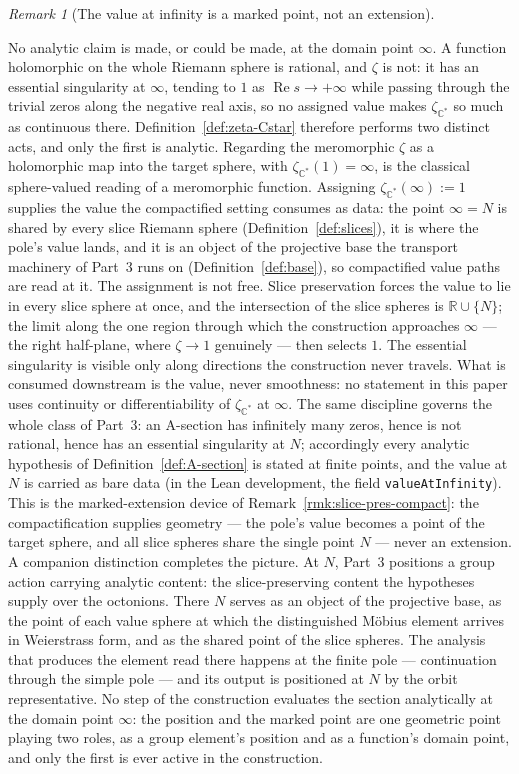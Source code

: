 \documentclass[11pt]{article}
\newcommand{\CC}{\mathbb{C}}
\newcommand{\RR}{\mathbb{R}}
\newcommand{\Cstar}{\CC^{*}}
\newcommand{\zetaC}{\zeta_{\Cstar}}
\DeclareMathOperator{\re}{Re}
\providecommand{\uses}[1]{}
\theoremstyle{plain}
\theoremstyle{definition}
\theoremstyle{remark}
\newtheorem{remark}[theorem]{Remark}
\begin{document}
\begin{remark}[The value at infinity is a marked point, not an extension]\label{rmk:infty-marked}
\uses{def:zeta-Cstar}
No analytic claim is made, or could be made, at the domain point $\infty$. A function
holomorphic on the whole Riemann sphere is rational, and $\zeta$ is not: it has an
essential singularity at $\infty$, tending to $1$ as $\re s\to+\infty$ while passing
through the trivial zeros along the negative real axis, so no assigned value makes
$\zetaC$ so much as continuous there. Definition~\ref{def:zeta-Cstar} therefore
performs two distinct acts, and only the first is analytic. Regarding the meromorphic
$\zeta$ as a holomorphic map into the target sphere, with $\zetaC(1)=\infty$, is the
classical sphere-valued reading of a meromorphic function. Assigning
$\zetaC(\infty):=1$ supplies the value the compactified setting consumes as data: the
point $\infty=N$ is shared by every slice Riemann sphere
(Definition~\ref{def:slices}), it is where the pole's value lands, and it is an
object of the projective base the transport machinery of Part~3 runs on
(Definition~\ref{def:base}), so compactified value paths are read at it. The
assignment is not free. Slice preservation forces the value to lie in every slice
sphere at once, and the intersection of the slice spheres is $\RR\cup\{N\}$; the
limit along the one region through which the construction approaches $\infty$ ---
the right half-plane, where $\zeta\to1$ genuinely --- then selects $1$. The
essential singularity is visible only along directions the construction never
travels. What is consumed downstream is the value, never smoothness: no statement
in this paper uses continuity or differentiability of $\zetaC$ at $\infty$. The
same discipline governs the whole class of Part~3: an A-section has infinitely many
zeros, hence is not rational, hence has an essential singularity at $N$; accordingly
every analytic hypothesis of Definition~\ref{def:A-section} is stated at finite
points, and the value at $N$ is carried as bare data (in the Lean development, the
field \texttt{valueAtInfinity}). This is the marked-extension device of
Remark~\ref{rmk:slice-pres-compact}: the compactification supplies geometry --- the
pole's value becomes a point of the target sphere, and all slice spheres share the
single point $N$ --- never an extension.
A companion distinction completes the picture. At $N$, Part~3 positions a
group action carrying analytic content: the slice-preserving content
the hypotheses supply over the octonions. There $N$ serves as an object
of the projective base, as the point of each value sphere at which the
distinguished M\"obius element arrives in Weierstrass form, and as the shared
point of the slice spheres. The analysis that
produces the element read there happens at the finite pole --- continuation
through the simple pole --- and its output is positioned at $N$ by the orbit
representative. No step of the construction evaluates the section analytically at the
domain point $\infty$: the position and the marked point are one geometric point playing
two roles, as a group element's position and as a function's domain point, and
only the first is ever active in the construction.
\end{remark}
\end{document}

